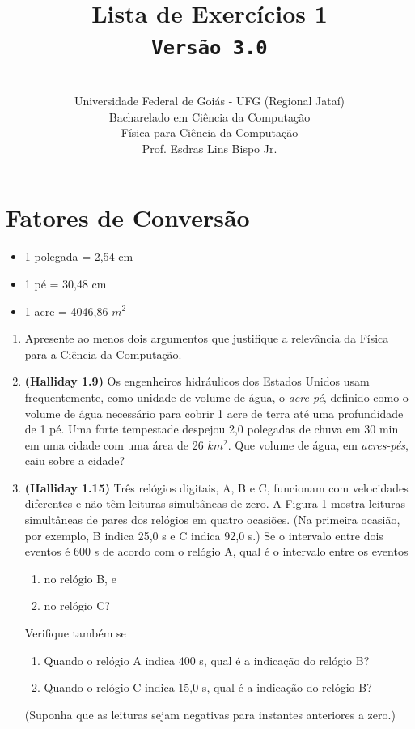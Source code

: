 \documentclass[12pt,a4paper,oneside]{article}
\author{\\Universidade Federal de Goiás - UFG (Regional Jataí) \\Bacharelado em Ciência da Computação \\Física para Ciência da Computação \\Prof. Esdras Lins Bispo Jr.}
\title{
	{\sc \huge Lista de Exercícios 1} 
	\\{\tt Versão 3.0}
}
\begin{document}
\maketitle


\section{Fatores de Conversão}
	\begin{itemize}
		\item 1 polegada = 2,54 cm
		\item 1 pé = 30,48 cm
		\item 1 acre = 4046,86 $m^2$
	\end{itemize}

\begin{enumerate}

\section{Conceitos}

	\item Apresente ao menos dois argumentos que justifique a relevância da Física para a Ciência da Computação.
	
	\item {\bf (Halliday 1.9)} Os engenheiros hidráulicos dos Estados Unidos usam frequentemente, como unidade de volume de água, o {\it acre-pé}, definido como o volume de água necessário para cobrir 1 acre de terra até uma profundidade de 1 pé. Uma forte tempestade despejou 2,0 polegadas de chuva em 30 min em uma cidade com uma área de 26 $km^2$. Que volume de água, em {\it acres-pés}, caiu sobre a cidade?
	
	\item {\bf (Halliday 1.15)} Três relógios digitais, A, B e C, funcionam com velocidades diferentes e não têm leituras simultâneas de zero. A Figura 1 mostra leituras simultâneas de pares dos relógios em quatro ocasiões. (Na primeira ocasião, por exemplo, B indica 25,0 s e C indica 92,0 s.) Se o intervalo entre dois eventos é 600 s de acordo com o relógio A, qual é o intervalo entre os eventos 
		\begin{enumerate}
			\item no relógio B, e
			\item no relógio C?
		\end{enumerate}
	Verifique também se
		\begin{enumerate}
			\item Quando o relógio A indica 400 s, qual é a indicação do relógio B?
			\item Quando o relógio C indica 15,0 s, qual é a indicação do relógio B?
		\end{enumerate}
	(Suponha que as leituras sejam negativas para instantes anteriores a zero.)
	

\end{enumerate}
\end{document}
